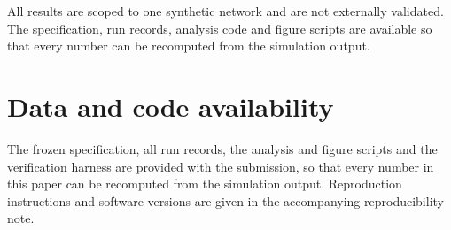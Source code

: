 \documentclass[preprint,12pt]{elsarticle}
\begin{document}
All results are scoped to one synthetic network and are not externally validated.
The specification, run records, analysis code and figure scripts are available so
that every number can be recomputed from the simulation output.

\section*{Data and code availability}

The frozen specification, all run records, the analysis and figure scripts and
the verification harness are provided with the submission, so that every number
in this paper can be recomputed from the simulation output. Reproduction
instructions and software versions are given in the accompanying
reproducibility note.



\end{document}
